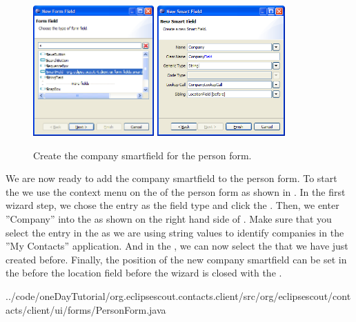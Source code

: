 \documentclass[a4paper,10pt,twoside]{book}
\begin{document}
\begin{figure}
\includegraphics[height=5cm]{new_smartfield_company_1.png} \hspace{5mm}
\includegraphics[height=5cm]{new_smartfield_company_2.png}
\caption{Create the company smartfield for the person form.}
\end{figure}

We are now ready to add the company smartfield to the person form. 
To start the  we use the context menu on the  of the person form as shown in .
In the first wizard step, we chose the  entry as the field type and click the . 
Then, we enter ''Company'' into the  as shown on the right hand side of . 
Make sure that you select the  entry in the  as we are using string values to identify companies in the ''My Contacts'' application. 
And in the , we can now select the  that we have just created before. 
Finally, the position of the new company smartfield can be set in the  before the location field before the wizard is closed with the . 


{../code/oneDayTutorial/org.eclipsescout.contacts.client/src/org/eclipsescout/contacts/client/ui/forms/PersonForm.java}
\end{document}
